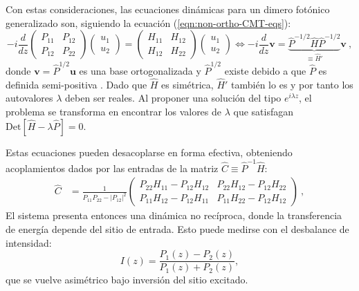 Con estas consideraciones, las ecuaciones dinámicas para un dimero fotónico generalizado son, siguiendo la ecuación (\ref{eqn:non-ortho-CMT-eqs}):
\begin{equation}
	-i
	\frac{d}{dz}
	\begin{pmatrix}
	P_{11} & P_{12}
	\\
	P_{12} & P_{22}	
\end{pmatrix}
\begin{pmatrix}
	u_1
	\\
	u_2	
\end{pmatrix}
=
\begin{pmatrix}
	H_{11} & H_{12}
	\\
	H_{12} & H_{22}	
\end{pmatrix}
\begin{pmatrix}
	u_1
	\\
	u_2	
\end{pmatrix} \iff -i\frac{d}{dz}\textbf{v} = \underbrace{\hat{P}^{-1/2}\hat{H}\hat{P}^{-1/2}}_{\equiv \hat{H}'} \textbf{v} \ ,
\end{equation}
donde $\textbf{v}=\hat{P}^{1/2}\textbf{u}$ es una base ortogonalizada y $\hat{P}^{1/2}$ existe debido a que $\hat{P}$ es definida semi-positiva \cite{haus_coupled-mode}. Dado que $\hat{H}$ es simétrica, $\hat{H}'$ también lo es y por tanto los autovalores $\lambda$ deben ser reales. Al proponer una solución del tipo $e^{i\lambda z}$, el problema se transforma en encontrar los valores de $\lambda$ que satisfagan $\text{Det}[ \hat{H} - \lambda\hat{P}]=0$. 


Estas ecuaciones pueden desacoplarse en forma efectiva, obteniendo acoplamientos dados por las entradas de la matriz $\hat{C}\equiv\hat{P}^{-1}\hat{H}$:
\begin{align}
	\hat{C} &=  \frac{1}{P_{11}P_{22}-|P_{12}|^2}\begin{pmatrix}
P_{22}H_{11} - P_{12}H_{12} & P_{22}H_{12} - P_{12}H_{22}
\\
P_{11}H_{12} - P_{12}H_{11} & P_{11}H_{22} - P_{12}H_{12}	
\end{pmatrix} \ ,
\end{align}
El sistema presenta entonces una dinámica no recíproca, donde la transferencia de energía depende del sitio de entrada. Esto puede medirse con el desbalance de intensidad:
\begin{equation}
	I(z) = \frac{P_1(z) - P_2(z)}{P_1(z) + P_2(z)},
\end{equation}
que se vuelve asimétrico bajo inversión del sitio excitado.

